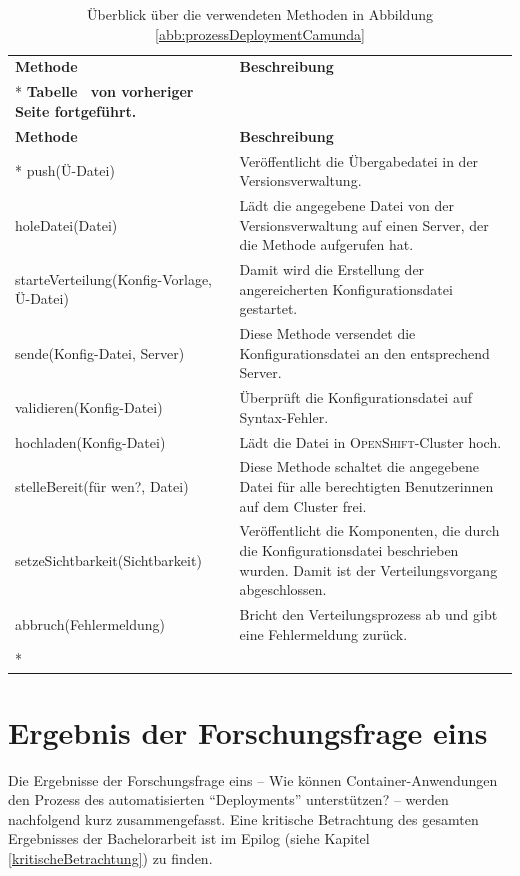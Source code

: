 \begin{longtable}{@{}p{5.5cm}p{8.0cm}@{}}
	\toprule[1.5pt]
	\textbf{Methode} & \textbf{Beschreibung} \\* \midrule
	\endfirsthead
	\multicolumn{2}{c}%
	{{\bfseries Tabelle \thetable\ von vorheriger Seite fortgeführt.}} \\
	\toprule
	\textbf{Methode} & \textbf{Beschreibung} \\* \midrule
	\endhead
	\bottomrule
	\endfoot
	\endlastfoot
	push(Ü-Datei) & Veröffentlicht die Übergabedatei in der Versionsverwaltung. \\
	holeDatei(Datei) & Lädt die angegebene Datei von der Versionsverwaltung auf einen Server, der die Methode aufgerufen hat. \\
	starteVerteilung(Konfig-Vorlage, Ü-Datei) & Damit wird die Erstellung der angereicherten Konfigurationsdatei gestartet. \\
	sende(Konfig-Datei, Server) & Diese Methode versendet die Konfigurationsdatei an den entsprechend Server. \\
	validieren(Konfig-Datei) & Überprüft die Konfigurationsdatei auf Syntax-Fehler. \\
	hochladen(Konfig-Datei) & Lädt die Datei in \textsc{OpenShift}-Cluster hoch.\\
	stelleBereit(für wen?, Datei) & Diese Methode schaltet die angegebene Datei für alle berechtigten Benutzerinnen auf dem Cluster frei.\\
	setzeSichtbarkeit(Sichtbarkeit) & Veröffentlicht die Komponenten, die durch die Konfigurationsdatei beschrieben wurden. Damit ist der Verteilungsvorgang abgeschlossen.\\
	abbruch(Fehlermeldung) & Bricht den Verteilungsprozess ab und gibt eine Fehlermeldung zurück.\\* \bottomrule
	
	\caption{Überblick über die verwendeten Methoden in Abbildung \vref{abb:prozessDeploymentCamunda}}\label{tab:methodenFunktion}\\
\end{longtable}
 
\section{Ergebnis der Forschungsfrage eins}
Die Ergebnisse der Forschungsfrage eins -- Wie können Container-Anwendungen den Prozess des automatisierten \enquote{Deployments} unterstützen? -- werden nachfolgend kurz zusammengefasst. Eine kritische Betrachtung des gesamten Ergebnisses der Bachelorarbeit ist im Epilog (siehe Kapitel \vref{kritischeBetrachtung}) zu finden.

